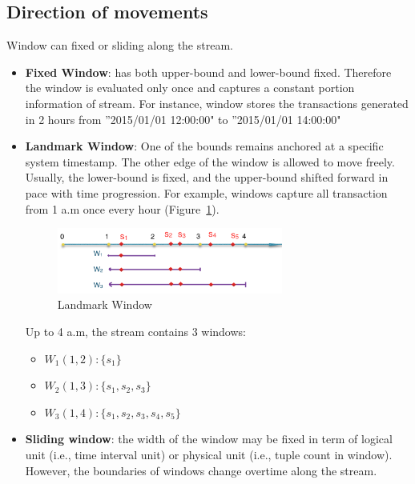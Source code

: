 \subsection{Direction of movements}
Window can fixed or sliding along the stream.
\begin{itemize}

\item \textbf{Fixed Window}:  has both upper-bound and lower-bound fixed. Therefore the window is evaluated only once and captures a constant portion information of stream. For instance, window stores the transactions generated in 2 hours from ''2015/01/01 12:00:00" to ''2015/01/01 14:00:00"

\item \textbf{Landmark Window}: One of the bounds remains  anchored at a specific system timestamp. The other edge of the window is allowed to move freely. Usually, the lower-bound is fixed, and the upper-bound shifted forward in pace with time progression.
For example, windows capture all transaction from 1 a.m once every hour (Figure~\ref{fig:landMarkWin}).

\begin{figure}[htbp!] 
\centering    
\includegraphics[width=0.7\textwidth]{landMarkWin}
\caption{Landmark Window}
\label{fig:landMarkWin}
\end{figure}

Up to 4 a.m, the stream contains 3 windows: 
\begin{itemize}
\item $W_1(1,2):\{s_1\}$ 
\item $W_2(1,3):\{s_1, s_2, s_3\}$ 
\item $W_3(1,4):\{s_1, s_2, s_3, s_4,s_5\}$ 
\end{itemize}

\item \textbf{Sliding window}: the width of the window may be fixed in term of logical unit (i.e., time interval unit) or physical unit (i.e., tuple count in window). However, the boundaries of windows change overtime along the stream.


\end{itemize}
